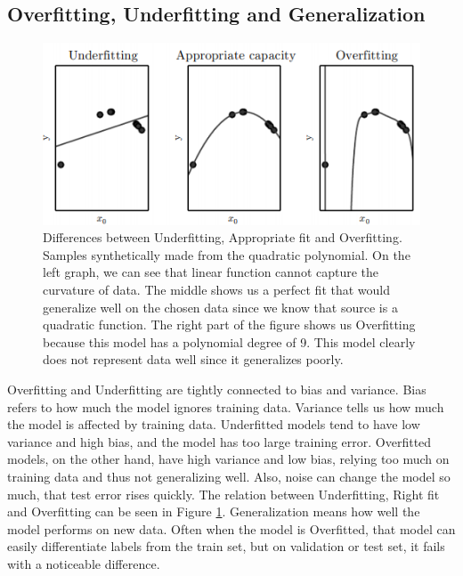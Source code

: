 \documentclass[thesis=B,english]{FITthesis}[2019/12/23]
\begin{document}
\subsection{Overfitting, Underfitting and Generalization} \label{sec:overfitting}
    
\begin{figure}
    \centering
    \includegraphics[width=.8\textwidth]{underfitting_overfitting.PNG}
    \caption[Underfitting and Overfitting]{Differences between Underfitting, Appropriate fit and Overfitting. Samples synthetically made from the quadratic polynomial. On the left graph, we can see that linear function cannot capture the curvature of data. The middle shows us a perfect fit that would generalize well on the chosen data since we know that source is a quadratic function. The right part of the figure shows us Overfitting because this model has a polynomial degree of 9. This model clearly does not represent data well since it generalizes poorly. \cite{bengio2017deep}}
    \label{fig:overfit}
\end{figure}
    Overfitting and Underfitting are tightly connected to bias and variance. Bias refers to how much the model ignores training data. Variance tells us how much the model is affected by training data. Underfitted models tend to have low variance and high bias, and the model has too large training error. Overfitted models, on the other hand, have high variance and low bias, relying too much on training data and thus not generalizing well. Also, noise can change the model so much, that test error rises quickly. The relation between Underfitting, Right fit and Overfitting can be seen in Figure \ref{fig:overfit}. Generalization means how well the model performs on new data. Often when the model is Overfitted, that model can easily differentiate labels from the train set, but on validation or test set, it fails with a noticeable difference. 
    
\end{document}
